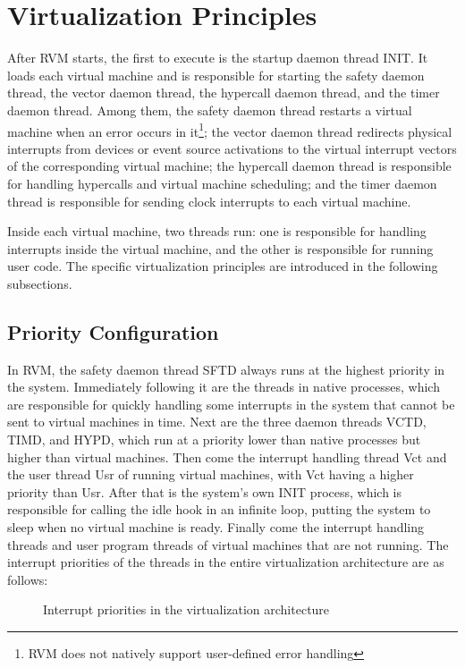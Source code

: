 \section{Virtualization Principles}\label{sec:2-2}

After RVM starts, the first to execute is the startup daemon thread INIT. It loads each virtual machine and is responsible for starting the safety daemon thread, the vector daemon thread, the hypercall daemon thread, and the timer daemon thread. Among them, the safety daemon thread restarts a virtual machine when an error occurs in it\footnote{RVM does not natively support user-defined error handling}; the vector daemon thread redirects physical interrupts from devices or event source activations to the virtual interrupt vectors of the corresponding virtual machine; the hypercall daemon thread is responsible for handling hypercalls and virtual machine scheduling; and the timer daemon thread is responsible for sending clock interrupts to each virtual machine.

Inside each virtual machine, two threads run: one is responsible for handling interrupts inside the virtual machine, and the other is responsible for running user code. The specific virtualization principles are introduced in the following subsections.

\subsection{Priority Configuration}\label{subsec:2-2-1}

In RVM, the safety daemon thread SFTD always runs at the highest priority in the system. Immediately following it are the threads in native processes, which are responsible for quickly handling some interrupts in the system that cannot be sent to virtual machines in time. Next are the three daemon threads VCTD, TIMD, and HYPD, which run at a priority lower than native processes but higher than virtual machines. Then come the interrupt handling thread Vct and the user thread Usr of running virtual machines, with Vct having a higher priority than Usr. After that is the system's own INIT process, which is responsible for calling the idle hook in an infinite loop, putting the system to sleep when no virtual machine is ready. Finally come the interrupt handling threads and user program threads of virtual machines that are not running. The interrupt priorities of the threads in the entire virtualization architecture are as follows:


\begin{figure}[htbp]
\centering
\resizebox{\textwidth}{!}{}
\caption{Interrupt priorities in the virtualization architecture}\label{fig:2-2}
\end{figure}


